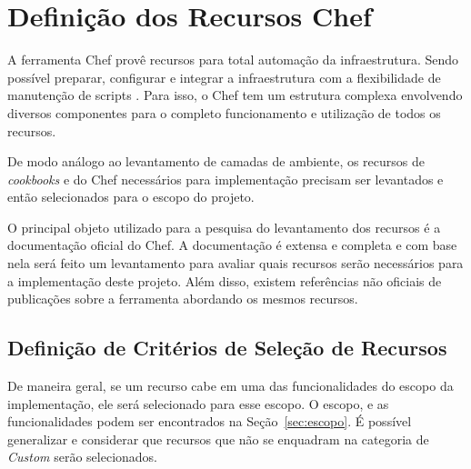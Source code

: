 \section{Definição dos Recursos Chef}
\label{sec:def_recurso}

A ferramenta Chef provê recursos para total automação da infraestrutura.
Sendo possível preparar, configurar e integrar a infraestrutura com a
flexibilidade de manutenção de scripts \cite{sharma:2015}. Para isso, o
Chef tem um estrutura complexa envolvendo diversos componentes para
o completo funcionamento e utilização de todos os recursos.

De modo análogo ao levantamento de camadas de ambiente, os recursos
de \textit{cookbooks} e do Chef necessários para implementação precisam
ser levantados e então selecionados para o escopo do projeto.

O principal objeto utilizado para a pesquisa do levantamento dos recursos
é a documentação oficial do Chef. A documentação é extensa e completa e
com base nela será feito um levantamento para avaliar quais recursos
serão necessários para a implementação deste projeto. Além disso, existem
referências não oficiais de publicações sobre a ferramenta abordando os
mesmos recursos.

\subsection{Definição de Critérios de Seleção de Recursos}
\label{sec:defcritrecurso}

De maneira geral, se um recurso cabe em uma das funcionalidades do escopo da
implementação, ele será selecionado para esse escopo. O escopo, e as
funcionalidades podem ser encontrados na Seção~\ref{sec:escopo}. É possível
generalizar e considerar que recursos que não se enquadram na categoria de
\textit{Custom} serão selecionados.
